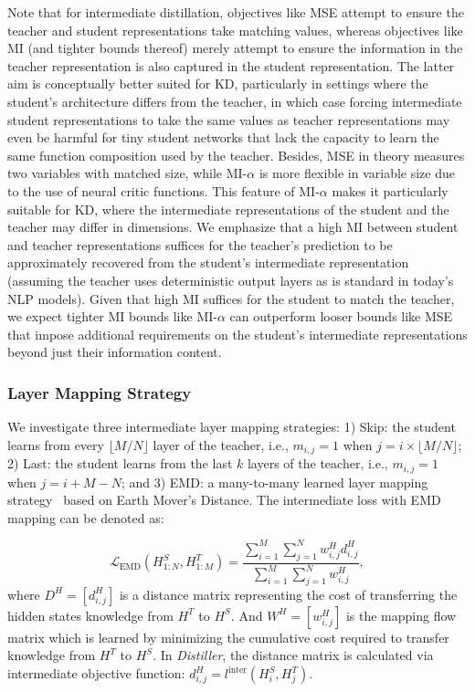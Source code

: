 \documentclass[11pt]{article}
\newcommand{\floor}[1]{\lfloor #1 \rfloor}
\begin{document}
Note that for intermediate distillation, objectives like MSE attempt to ensure the teacher and student representations take matching values, whereas objectives like MI (and tighter bounds thereof) merely attempt to ensure the information in the teacher representation is also captured in the student representation. 
The latter aim is conceptually better suited for KD, particularly in settings where the student's architecture differs from the teacher, in which case forcing intermediate student representations to take the same values as teacher representations may even be harmful for tiny student networks that lack the capacity to learn the same function composition used by the teacher. Besides, MSE in theory measures two variables with matched size, while MI-$\alpha$ is more flexible in variable size due to the use of neural critic functions. This feature of MI-$\alpha$ makes it particularly suitable for KD, where the intermediate representations of the student and the teacher may differ in dimensions.
We emphasize that a high MI between student and teacher representations suffices for the teacher's prediction to be approximately recovered from the student's intermediate representation (assuming the teacher uses deterministic output layers as is standard in today's NLP models). Given that high MI suffices for the student to match the teacher, we expect tighter MI bounds like MI-$\alpha$ can outperform looser bounds like MSE that impose additional requirements on the student's intermediate representations beyond just their information content.
\subsubsection{Layer Mapping Strategy}
We investigate three intermediate layer mapping strategies: 1) Skip: the student learns from every $\floor{M/N}$ layer of the
teacher, i.e., $m_{i,j}=1$ when $j=i\times \floor{M/N}$; 2) Last: the student learns from the last $k$ layers of the teacher, i.e., $m_{i,j}=1$ when $j=i+M - N$; and 3) EMD: a many-to-many learned layer mapping strategy~\citep{li2020bert} based on Earth Mover's Distance. The intermediate loss with EMD mapping can be denoted as:

\begin{equation}
    \mathcal{L}_{\text{EMD}}(H^S_{1:N},H^T_{1:M})=\frac{\sum_{i=1}^{M}\sum_{j=1}^{N}w_{i,j}^H d_{i,j}^H}{\sum_{i=1}^{M}\sum_{j=1}^{N}w_{i,j}^H},
\end{equation}
where $D^H=[d_{i,j}^H]$ is a distance matrix representing the cost of transferring the hidden states knowledge from $H^T$ to $H^S$. And $W^H=[w_{i,j}^H]$ is the mapping flow matrix which is learned by minimizing the cumulative cost required to transfer knowledge from $H^T$ to $H^S$. In \emph{Distiller}, the distance matrix is calculated via intermediate objective function: $d_{i,j}^H=l^{\text{inter}}(H_i^S,H_j^T)$.  
\end{document}
